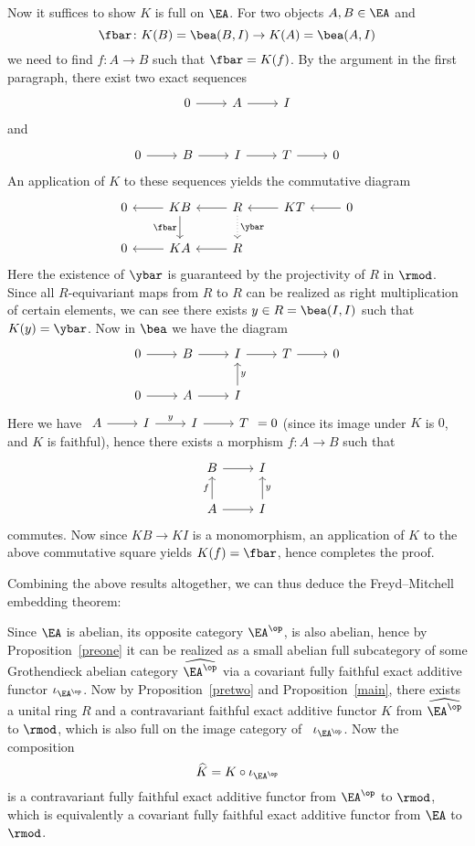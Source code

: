 \documentclass[twoside]{article}
\begin{document}
Now it suffices to show $K$ is full on $\EA$. For two objects $A, B \in \EA$ and $$\fbar\colon K(B) = \bea(B,I) \rightarrow K(A) = \bea(A, I)$$ we need to find $f\colon A \rightarrow B$ such that $\fbar = K(f)$. By the argument in the first paragraph, there exist two exact sequences
$$\begin{tikzcd}
    0 \ar[r] & A \ar[r] & I
\end{tikzcd}$$
and $$\begin{tikzcd}
    0 \ar[r] & B \ar[r] & I \ar[r] & T \ar[r] & 0
\end{tikzcd}$$
An application of $K$ to these sequences yields the commutative  diagram $$\begin{tikzcd}
    0& KB \ar[d, "\fbar"'] \ar[l] & R \ar[d, dotted, "\ybar"]\ar[l] & KT\ar[l] & 0 \ar[l]\\
0 & KA \ar[l] & R \ar[l]
\end{tikzcd}$$
Here the existence of $\ybar$ is guaranteed by the projectivity of $R$ in $\rmod$. Since all $R$-equivariant maps from $R$ to $R$ can be realized as right multiplication of certain elements, we can see there exists $y \in R = \bea(I,I)$ such that $K(y) = \ybar$. Now in $\bea$ we have the diagram
$$\begin{tikzcd}
    0 \ar[r] & B \ar[r] & I  \ar[r] & T \ar[r] & 0 \\
0 \ar[r] & A \ar[r] & I \ar[u, "y"']
\end{tikzcd}$$
Here we have $\begin{tikzcd}
    A \ar[r] & I \ar[r, "y"] & I \ar[r] & T
\end{tikzcd} = 0$ (since its image under $K$ is $0$, and $K$ is faithful), hence there exists a morphism $f\colon A \rightarrow B$ such that 
$$\begin{tikzcd}
    B \ar[r] & I  \\
A \ar[u, "f"] \ar[r] & I \ar[u, "y"']
\end{tikzcd}$$
commutes. Now since $KB \rightarrow KI$ is a monomorphism, an application of $K$ to the above commutative square yields $K(f) = \fbar$, hence completes the proof.
\epf

Combining the above results altogether, we can thus deduce the Freyd--Mitchell embedding theorem:

Since $\EA$ is abelian, its opposite category $\EA^\op$, is also abelian, hence by Proposition~\ref{preone} it can be realized as a small abelian full subcategory of some Grothendieck abelian category $\widehat{\EA^\op}$ via a covariant fully faithful exact additive functor $\iota_{\EA^\op}$. Now by Proposition~\ref{pretwo} and Proposition~\ref{main}, there exists a unital ring $R$ and a contravariant faithful exact additive functor $K$ from $\widehat{\EA^\op}$ to $\rmod$, which is also full on the image category of \ $\iota_{\EA^\op}$. Now the composition $$\widehat{K} = K \circ \iota_{\EA^\op}$$ is a contravariant fully faithful exact additive functor from $\EA^\op$ to $\rmod$, which is equivalently a covariant fully faithful exact additive functor from $\EA$ to $\rmod$. 
\epf
\end{document}
